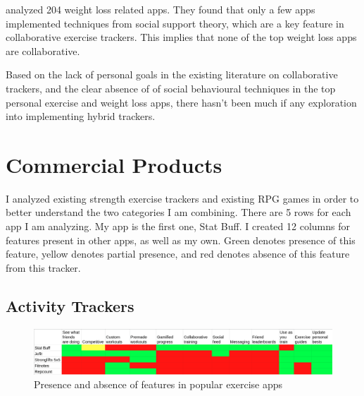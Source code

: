 \documentclass{l4proj}
\begin{document}
\citet{weight_loss} analyzed 204 weight loss related apps. They found that only a few apps implemented techniques from social support theory, which are a key feature in collaborative exercise trackers. This implies that none of the top weight loss apps are collaborative.

Based on the lack of personal goals in the existing literature on collaborative trackers, and the clear absence of of social behavioural techniques in the top personal exercise and weight loss apps, there hasn't been much if any exploration into implementing hybrid trackers.


\section{Commercial Products}
I analyzed existing strength exercise trackers and existing RPG games in order to better understand the two categories I am combining. There are 5 rows for each app I am analyzing. My app is the first one, Stat Buff. I created 12 columns for features present in other apps, as well as my own. Green denotes presence of this feature, yellow denotes partial presence, and red denotes absence of this feature from this tracker.

\subsection{Activity Trackers}
\begin{figure}[H]
    \centering
    \includegraphics[width=1.0\linewidth]{exercise_comparisons.png}    
    \caption{Presence and absence of features in popular exercise apps}
    \label{fig:exercises} 
\end{figure}
\end{document}
